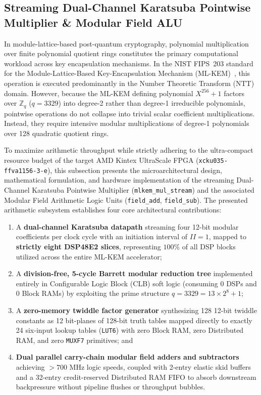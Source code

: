 \subsection{Streaming Dual-Channel Karatsuba Pointwise Multiplier \& Modular Field ALU}
\label{sec:karatsuba}

In module-lattice-based post-quantum cryptography, polynomial multiplication over finite polynomial quotient rings constitutes the primary computational workload across key encapsulation mechanisms. In the NIST FIPS~203 standard for the Module-Lattice-Based Key-Encapsulation Mechanism (\mbox{ML-KEM})~\cite{fips203}, this operation is executed predominantly in the Number Theoretic Transform ($\text{NTT}$) domain. However, because the \mbox{ML-KEM} defining polynomial $X^{256} + 1$ factors over $\mathbb{Z}_q$ ($q = 3329$) into degree-2 rather than degree-1 irreducible polynomials, pointwise operations do not collapse into trivial scalar coefficient multiplications. Instead, they require intensive modular multiplications of degree-1 polynomials over 128 quadratic quotient rings.

To maximize arithmetic throughput while strictly adhering to the ultra-compact resource budget of the target AMD Kintex UltraScale FPGA (\texttt{xcku035-ffva1156-3-e}), this subsection presents the microarchitectural design, mathematical formulation, and hardware implementation of the streaming Dual-Channel Karatsuba Pointwise Multiplier (\texttt{mlkem\_mul\_stream}) and the associated Modular Field Arithmetic Logic Units (\texttt{field\_add}, \texttt{field\_sub}). The presented arithmetic subsystem establishes four core architectural contributions:
\begin{enumerate}
    \item A \textbf{dual-channel Karatsuba datapath} streaming four 12-bit modular coefficients per clock cycle with an initiation interval of $II = 1$, mapped to \textbf{strictly eight DSP48E2 slices}, representing $100\%$ of all DSP blocks utilized across the entire \mbox{ML-KEM} accelerator;
    \item A \textbf{division-free, 5-cycle Barrett modular reduction tree} implemented entirely in Configurable Logic Block (CLB) soft logic (consuming 0 DSPs and 0 Block RAMs) by exploiting the prime structure $q = 3329 = 13 \times 2^8 + 1$;
    \item A \textbf{zero-memory twiddle factor generator} synthesizing 128 12-bit twiddle constants as 12 bit-planes of 128-bit truth tables mapped directly to exactly 24 six-input lookup tables (\texttt{LUT6}) with zero Block RAM, zero Distributed RAM, and zero \texttt{MUXF7} primitives; and
    \item \textbf{Dual parallel carry-chain modular field adders and subtractors} achieving $>700\text{ MHz}$ logic speeds, coupled with 2-entry elastic skid buffers and a 32-entry credit-reserved Distributed RAM FIFO to absorb downstream backpressure without pipeline flushes or throughput bubbles.
\end{enumerate}

